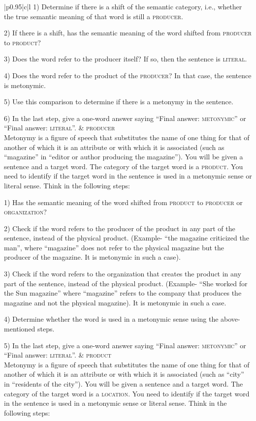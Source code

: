 \documentclass[11pt]{article}
\begin{document}
\begin{table*}[h]
{\begin{NiceTabular}{|p{0.95\linewidth}|c|l}
    1) Determine if there is a shift of the semantic category, i.e., whether the true semantic meaning of that word is still a \textsc{producer}. 
    
    2) If there is a shift, has the semantic meaning of the word shifted from \textsc{producer} to \textsc{product}? 
    
    3) Does the word refer to the producer itself? If so, then the sentence is \textsc{literal}. 
    
    4) Does the word refer to the product of the \textsc{producer}? In that case, the sentence is metonymic. 
    
    5) Use this comparison to determine if there is a metonymy in the sentence. 
    
    6) In the last step, give a one-word answer saying ``Final answer: \textsc{metonymic}'' or ``Final answer: \textsc{literal}''. & \textsc{producer} \\
    \midrule
    Metonymy is a figure of speech that substitutes the name of one thing for that of another of which it is an attribute or with which it is associated (such as ``magazine'' in ``editor or author producing the magazine''). You will be given a sentence and a target word. The category of the target word is a \textsc{product}. You need to identify if the target word in the sentence is used in a metonymic sense or literal sense. Think in the following steps: 
    
    1) Has the semantic meaning of the word shifted from \textsc{product} to \textsc{producer} or \textsc{organization}? 
    
    2) Check if the word refers to the producer of the product in any part of the sentence, instead of the physical product. (Example- ``the magazine criticized the man'', where ``magazine'' does not refer to the physical magazine but the producer of the magazine. It is metonymic in such a case). 
    
    3) Check if the word refers to the organization that creates the product in any part of the sentence, instead of the physical product. (Example- ``She worked for the Sun magazine'' where ``magazine'' refers to the company that produces the magazine and not the physical magazine). It is metonymic in such a case. 
    
    4) Determine whether the word is used in a metonymic sense using the above-mentioned steps. 
    
    5) In the last step, give a one-word answer saying ``Final answer: \textsc{metonymic}'' or ``Final answer: \textsc{literal}''. & \textsc{product} \\
    \midrule
    Metonymy is a figure of speech that substitutes the name of one thing for that of another of which it is an attribute or with which it is associated (such as ``city'' in ``residents of the city''). You will be given a sentence and a target word. The category of the target word is a \textsc{location}. You need to identify if the target word in the sentence is used in a metonymic sense or literal sense. Think in the following steps: 
    

\end{NiceTabular}}
\end{table*}
\end{document}

